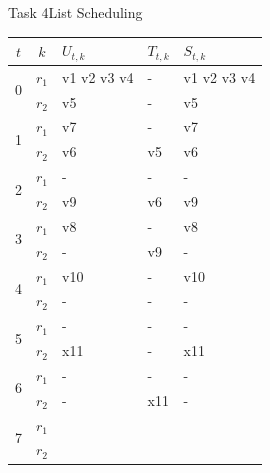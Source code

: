 \begin{frame}{Task 4}{List Scheduling}
  \begin{solutionnoinc}
    \centering
    \tiny
    \begin{tabular}{c|c|l|l|l|}
    \hline$t$ & $k$ & $U_{t, k}$ & $T_{t, k}$ & $S_{t, k}$ \\
    \hline \multirow{2}{*}{0} & $r_1$ & v1 v2 v3 v4 & - & v1 v2 v3 v4\\
    \cline { 2 - 5 } & $r_2$ & v5 & - & v5 \\
    \hline \multirow{2}{*}{1} & $r_1$ & v7 & - & v7 \\
    \cline { 2 - 5 } & $r_2$ & v6 & v5 & v6 \\
    \hline \multirow{2}{*}{2} & $r_1$ & - & - & - \\
    \cline { 2 - 5 } & $r_2$ & v9 & v6 & v9 \\
    \hline \multirow{2}{*}{3} & $r_1$ & v8 & - & v8 \\
    \cline { 2 - 5 } & $r_2$ & - & v9 & - \\
    \hline \multirow{2}{*}{4} & $r_1$ & v10 & - & v10 \\
    \cline { 2 - 5 }  & $r_2$ & - & - & - \\
    \hline \multirow{2}{*}{5} & $r_1$ & - & - & - \\
    \cline { 2 - 5 } & $r_2$ & x11 & - & x11 \\
    \hline \multirow{2}{*}{6} & $r_1$ & - & - & - \\
    \cline { 2 - 5 } & $r_2$ & - & x11 & - \\
    \hline \multirow{2}{*}{7} & $r_1$ & & & \\
    \cline { 2 - 5 } & $r_2$ & & & \\
    \hline
    \end{tabular}
  \end{solutionnoinc}
\end{frame}
